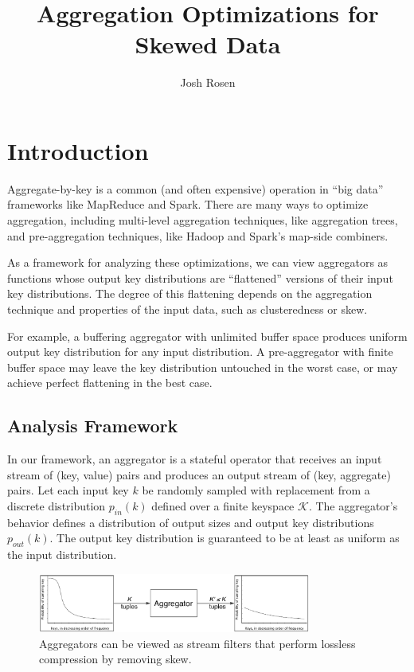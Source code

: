 \documentclass[twocolumn, 10pt]{article}
\title{Aggregation Optimizations for Skewed Data}
\author{Josh Rosen}
\newcommand{\keyspace}{\mathcal{K}}
\begin{document}
\maketitle

\section{Introduction}

Aggregate-by-key is a common (and often expensive) operation in ``big data''
frameworks like MapReduce and Spark.
%
There are many ways to optimize aggregation, including multi-level
aggregation techniques, like aggregation trees, and pre-aggregation
techniques, like Hadoop and Spark's map-side combiners.

As a framework for analyzing these optimizations, we can view aggregators as
functions whose output key distributions are ``flattened'' versions of their
input key distributions.  The degree of this flattening depends on the aggregation
technique and properties of the input data, such as clusteredness or skew.

For example, a buffering aggregator with unlimited buffer space produces
uniform output key distribution for any input distribution.  A pre-aggregator
with finite buffer space may leave the key distribution untouched in the worst
case, or may achieve perfect flattening in the best case.

\subsection{Analysis Framework}

In our framework, an aggregator is a stateful operator that receives an input
stream of (key, value) pairs and produces an output stream of (key, aggregate)
pairs.  Let each input key $k$ be randomly sampled with replacement
from a discrete distribution $p_{in}(k)$ defined over a finite keyspace
$\keyspace$.  The aggregator's behavior defines
a distribution of output sizes and output key distributions $p_{out}(k)$.
The output key distribution is guaranteed to be at least as uniform as the
input distribution.

\begin{figure}
\begin{center}
    \includegraphics[width=0.8\textwidth]{figures/aggregator_as_filter}
\end{center}
\caption{Aggregators can be viewed as stream filters that perform lossless
compression by removing skew.}
\label{fig:aggregator_as_filter}
\end{figure}
\end{document}
